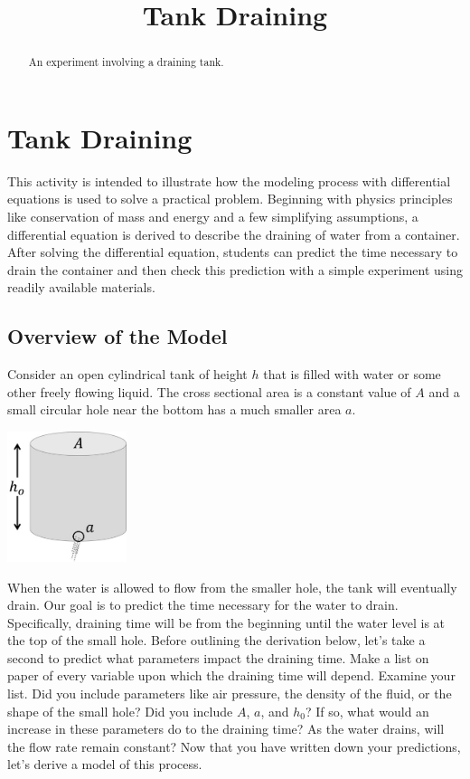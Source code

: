 \documentclass{ximera}
\title{Tank Draining}
\begin{document}
  
\begin{abstract}
An experiment involving a draining tank.
\end{abstract}
  
\maketitle
  
\section*{Tank Draining}  

This activity is intended to illustrate how the modeling process with differential equations is used to solve a practical problem.  Beginning with physics principles like conservation of mass and energy and a few simplifying assumptions, a differential equation is derived to describe the draining of water from a container.  After solving the differential equation, students can predict the time necessary to drain the container and then check this prediction with a simple experiment using readily available materials.

\subsection*{Overview of the Model}

Consider an open cylindrical tank of height $h$ that is filled with water or some other freely flowing liquid.  The cross sectional area is a constant value of $A$ and a small circular hole near the bottom has a much smaller area $a$.  

\begin{image}
 \includegraphics[height=1.5in]{drainingTank1.jpg}
\end{image}

When the water is allowed to flow from the smaller hole, the tank will eventually drain.  Our goal is to predict the time necessary for the water to drain.  Specifically, draining time will be from the beginning until the water level is at the top of the small hole.  Before outlining the derivation below, let’s take a second to predict what parameters impact the draining time.  Make a list on paper of every variable upon which the draining time will depend.
Examine your list.  Did you include parameters like air pressure, the density of the fluid, or the shape of the small hole?  Did you include $A$, $a$, and $h_0$?  If so, what would an increase in these parameters do to the draining time?  As the water drains, will the flow rate remain constant?  Now that you have written down your predictions, let’s derive a model of this process.
\end{document}
